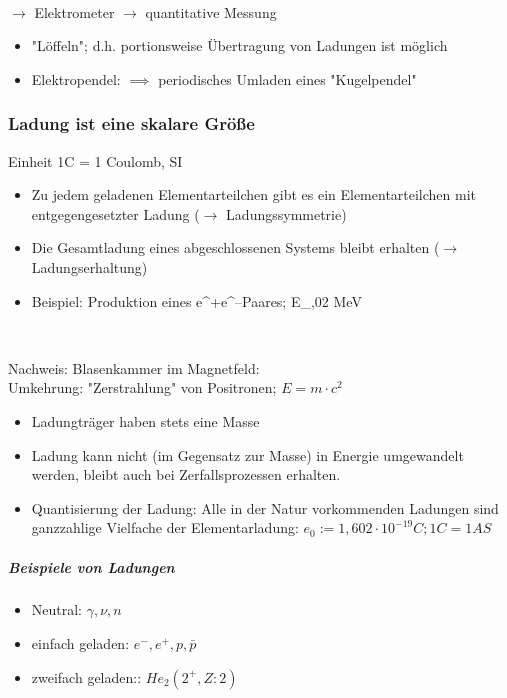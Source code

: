 \documentclass[11pt]{article}
\begin{document}
			\linebreak\\
			$\rightarrow$ Elektrometer $\rightarrow$ quantitative Messung
			\begin{itemize}
				\item "Löffeln"; d.h. portionsweise Übertragung von Ladungen ist möglich
				\item Elektropendel: $\implies$ periodisches Umladen eines "Kugelpendel"
			\end{itemize}
			
			\subsubsection{Ladung ist eine skalare Größe } Einheit 1C = 1 Coulomb, SI
				\begin{itemize}
					\item Zu jedem geladenen Elementarteilchen gibt es ein Elementarteilchen mit entgegengesetzter Ladung ($\rightarrow$ Ladungssymmetrie)
					\item Die Gesamtladung eines abgeschlossenen Systems bleibt erhalten ($\rightarrow$ Ladungserhaltung)
					\item Beispiel: Produktion eines e^+e^--Paares; E_\gamma {},02 MeV
				\end{itemize}
				\linebreak\\
				
				\newpage
				
				Nachweis: Blasenkammer im Magnetfeld:
				\linebreak\\
				Umkehrung: "Zerstrahlung" von Positronen; $E=m\cdot c^2$
				\begin{itemize}
					\item Ladungträger haben stets eine Masse
					\item Ladung kann nicht (im Gegensatz zur Masse) in Energie umgewandelt werden, bleibt auch bei Zerfallsprozessen erhalten.
					\item Quantisierung der Ladung: Alle in der Natur vorkommenden Ladungen sind ganzzahlige Vielfache der Elementarladung: $e_0:=1,602\cdot10^{-19}C; 1C=1AS$
				\end{itemize}
				\subparagraph{Beispiele von Ladungen}
				\begin{itemize}
					\item Neutral: $\gamma, \nu, n$
					\item einfach geladen: $e^-,e^+,p, \bar{p}$
					\item zweifach geladen:: $He_2(2^+,Z:2)$
				\end{itemize}	
				
\end{document}
